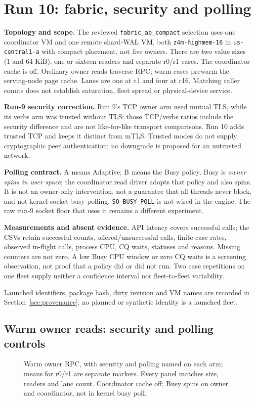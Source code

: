 \clearpage
\section{Run 10: fabric, security and polling}\label{sec:rwc10}
\textbf{Topology and scope.} The reviewed \texttt{fabric\_ab\_compact} selection uses one coordinator VM and one remote shard-WAL VM, both \texttt{z4m-highmem-16} in \texttt{us-central1-a} with compact placement, not five owners. There are two value sizes (1 and 64 KiB), one or sixteen readers and separate r0/r1 cases. The coordinator cache is off. Ordinary owner reads traverse RPC; warm cases prewarm the serving-node page cache. Lanes are one at c1 and four at c16. Matching caller counts does not establish saturation, fleet spread or physical-device service.

\textbf{Run-9 security correction.} Run 9's TCP owner arm used mutual TLS, while its verbs arm was trusted without TLS: those TCP/verbs ratios include the security difference and are not like-for-like transport comparisons. Run 10 adds trusted TCP and keeps it distinct from mTLS. Trusted modes do not supply cryptographic peer authentication; no downgrade is proposed for an untrusted network.

\textbf{Polling contract.} A means Adaptive; B means the Busy policy. Busy is \emph{owner spins in user space}; the coordinator read driver adopts that policy and also spins. It is not an owner-only intervention, not a guarantee that all threads never block, and not kernel socket busy polling. \texttt{SO\_BUSY\_POLL} is not wired in the engine. The raw run-9 socket floor that uses it remains a different experiment.

\textbf{Measurements and absent evidence.} API latency covers successful calls; the CSVs retain successful counts, offered/unsuccessful calls, finite-case rates, observed in-flight calls, process CPU, CQ waits, statuses and reasons. Missing counters are not zero. A low Busy CPU window or zero CQ waits is a screening observation, not proof that a policy did or did not run. Two case repetitions on one fleet supply neither a confidence interval nor fleet-to-fleet variability.

Launched identifiers, package hash, dirty revision and VM names are recorded in Section~\ref{sec:provenance}; no planned or synthetic identity is a launched fleet.


\clearpage
\subsection{Warm owner reads: security and polling controls}
\begin{figure}[H]\centering{}
\caption{Warm owner RPC, with security and polling named on each arm; means for r0/r1 are separate markers. Every panel matches size, readers and lane count. Coordinator cache off; Busy spins on owner and coordinator, not in kernel busy poll.}
\end{figure}

